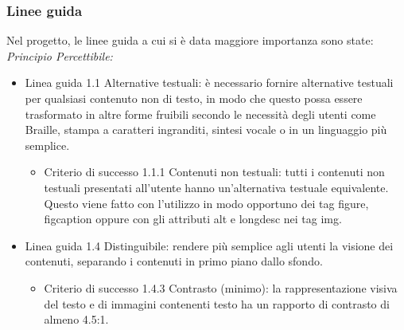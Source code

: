 \documentclass[a4paper,final,12pt]{report}
\begin{document}
\subsubsection{Linee guida}
Nel progetto, le linee guida a cui si è data maggiore importanza sono state:\\
\emph{Principio Percettibile:}
\begin{itemize}
\item Linea guida 1.1 Alternative testuali: è necessario fornire alternative testuali per qualsiasi contenuto non di testo, in modo che questo possa essere trasformato in altre forme fruibili secondo le necessità degli utenti come Braille, stampa a caratteri ingranditi, sintesi vocale o in un linguaggio più semplice.
\begin{itemize}
\item Criterio di successo 1.1.1 Contenuti non testuali: tutti i contenuti non testuali presentati all'utente hanno un'alternativa testuale equivalente. Questo viene fatto con l'utilizzo in modo opportuno dei tag figure, figcaption oppure con gli attributi alt e longdesc nei tag img.
\end{itemize}
\item Linea guida 1.4 Distinguibile: rendere più semplice agli utenti la visione dei contenuti, separando i contenuti in primo piano dallo sfondo.
\begin{itemize}
\item Criterio di successo 1.4.3 Contrasto (minimo): la rappresentazione visiva del testo e di immagini contenenti testo ha un rapporto di
contrasto di almeno 4.5:1.
\end{itemize}


\end{itemize}
\end{document}
